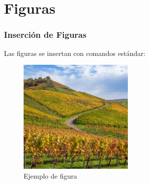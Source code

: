 \documentclass{pt-slides}
\begin{document}
\section{Figuras}

\begin{frame}
    \frametitle{Inserción de Figuras}

    Las figuras se insertan con comandos estándar:

    \begin{figure}
        \centering
        \includegraphics[width=0.5\textwidth]{figures/background-default}
        \caption{Ejemplo de figura}
    \end{figure}
\end{frame}
\end{document}
